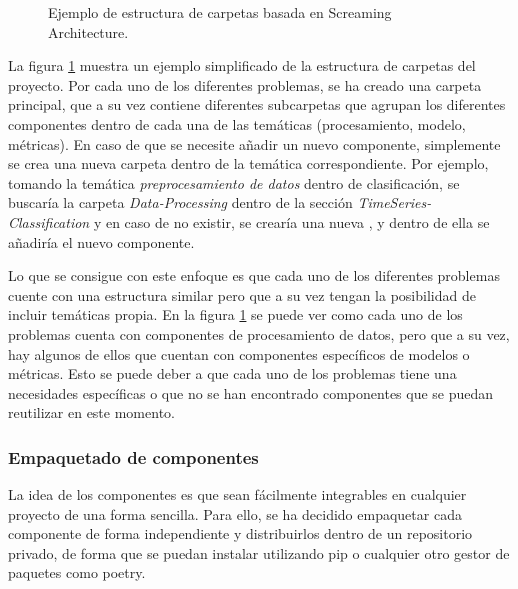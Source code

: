 \begin{figure}[!h]
    \caption{Ejemplo de estructura de carpetas basada en Screaming Architecture.}
    \label{fig:screaming-arch}
\end{figure}

La figura \ref{fig:screaming-arch} muestra un ejemplo simplificado de la estructura
de carpetas del proyecto. Por cada uno de los diferentes problemas, se ha creado una 
carpeta principal, que a su vez contiene diferentes subcarpetas que agrupan los 
diferentes componentes dentro de cada una de las temáticas (procesamiento, modelo, métricas). 
En caso de que se necesite añadir un nuevo componente, simplemente se crea una nueva
carpeta dentro de la temática correspondiente. Por ejemplo, tomando la temática \textit{preprocesamiento de datos}
dentro de clasificación, se buscaría la carpeta \textit{Data-Processing} dentro de la sección
\textit{TimeSeries-Classification} y en caso de no existir, se crearía una nueva , y dentro de ella 
se añadiría el nuevo componente. \medskip

Lo que se consigue con este enfoque es que cada uno de los diferentes problemas cuente con una 
estructura similar pero que a su vez tengan la posibilidad de incluir temáticas propia. En la
figura \ref{fig:screaming-arch} se puede ver como cada uno de los problemas cuenta con componentes
de procesamiento de datos, pero que a su vez, hay algunos de ellos que cuentan con componentes
específicos de modelos o métricas. Esto se puede deber a que cada uno de los problemas tiene
una necesidades específicas o que no se han encontrado componentes que se puedan reutilizar
en este momento.\medskip

\subsubsection{Empaquetado de componentes}
La idea de los componentes es que sean fácilmente integrables en cualquier
proyecto de una forma sencilla. Para ello, se ha decidido empaquetar cada
componente de forma independiente y distribuirlos dentro de un repositorio
privado, de forma que se puedan instalar utilizando pip o cualquier otro 
gestor de paquetes como poetry.\medskip

